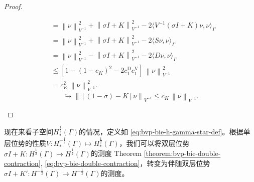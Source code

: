 \begin{proof}
\begin{enumerate}
\begin{equation*}
\begin{split}
      & =
      \left\| \nu \right\|_{V^{-1}}^{2}
      +
      \left\|
      \sigma I + K
      \right\|_{V^{-1}}^{2}
      - 2 \langle V^{-1} \left( \sigma I + K \right) \nu, \nu \rangle_{\Gamma} \\
      & =
      \left\| \nu \right\|_{V^{-1}}^{2}
      +
      \left\|
      \sigma I + K
      \right\|_{V^{-1}}^{2}
      - 2 \langle S \nu, \nu \rangle_{\Gamma}\\
      & =
      \left\| \nu \right\|_{V^{-1}}^{2}
      -
      \left\|
      \sigma I + K
      \right\|_{V^{-1}}^{2}
      - 2 \langle D \nu, \nu \rangle_{\Gamma}\\
      & \le
      \left[
      1 - \left( 1 - c_{K} \right)^{2} - 2 c_{1}^{\text{D}} c_{1}^{\text{V}}
      \right] \,
      \left\| \nu \right\|_{V^{-1}}^{2}\\
      & = c_{K}^{2} \, \left\| \nu \right\|_{V^{-1}}^{2}.
    \end{split}
  \end{equation*}
  \begin{equation*}
    \hookrightarrow \left\| \left[ \left(1-\sigma \right) -K \right] \nu
    \right\|_{V^{-1}} \le c_{K} \, \left\| \nu \right\|_{V^{-1}}.
  \end{equation*}
  \end{enumerate}
\end{proof}

现在来看子空间$H_{*}^{\frac{1}{2}}(\Gamma)$的情况，定义如  \eqref{eq:bvp-bie-h-gamma-star-def}。根据单层位势的性质$V:H_{*}^{-\frac{1}{2}}(\Gamma) \mapsto H_{*}^{\frac{1}{2}}(\Gamma)$，我们可以将双层位势$\sigma I + K : H^{\frac{1}{2}}(\Gamma) \mapsto H^{\frac{1}{2}}(\Gamma)$的测度 Theorem \ref{theorem:bvp-bie-double-contraction}, \eqref{eq:bvp-bie-double-contraction}，转变为伴随双层位势$\sigma I + K': H^{-\frac{1}{2}}(\Gamma) \mapsto H^{-\frac{1}{2}}(\Gamma)$的测度。

